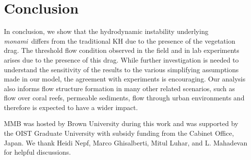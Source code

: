 \documentclass{jfm}
\newcommand{\monami}{\textit{monami}}
\begin{document}
\section{Conclusion}
In conclusion, we show that the hydrodynamic instability underlying \monami ~differs from the traditional KH due to the presence of the vegetation drag. 
The threshold flow condition observed in the field and in lab experiments arises due to the presence of this drag. 
While further investigation is needed to understand the sensitivity of the results to the various simplifying assumptions made in our model, the agreement with experiments is encouraging.
Our analysis also informs flow structure formation in many other related scenarios, such as flow over coral reefs, permeable sediments, flow through urban environments and therefore is expected to have a wider impact.

\acknowledgments
MMB was hosted by Brown University during this work and was supported by the OIST Graduate University with subsidy funding from the Cabinet Office, Japan. We thank Heidi Nepf, Marco Ghisalberti, Mitul Luhar, and L. Mahadevan for helpful discussions.

{}

% 
%
\end{document}
